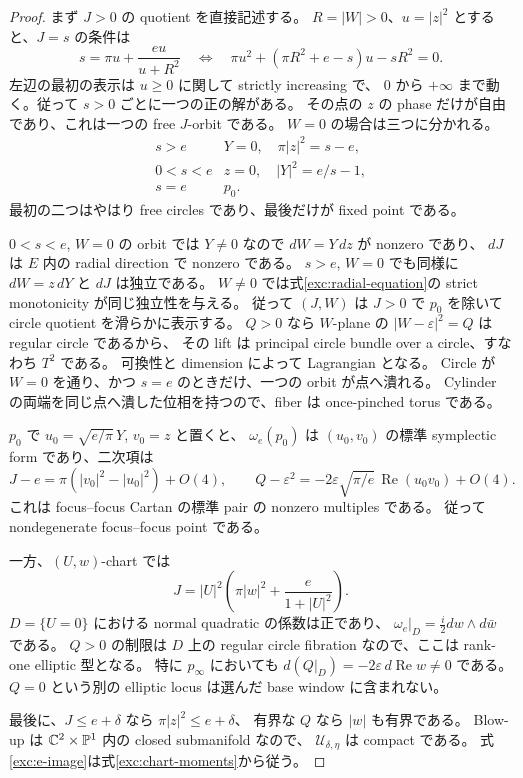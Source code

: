 \begin{proof}
まず $J>0$ の quotient を直接記述する。
$R=|W|>0$、$u=|z|^2$ とすると、$J=s$ の条件は
\begin{equation}\label{exc:radial-equation}
 s=\pi u+\frac{eu}{u+R^2}
 \quad\Longleftrightarrow\quad
 \pi u^2+(\pi R^2+e-s)u-sR^2=0.
\end{equation}
左辺の最初の表示は $u\ge0$ に関して strictly increasing で、
$0$ から $+\infty$ まで動く。従って $s>0$ ごとに一つの正の解がある。
その点の $z$ の phase だけが自由であり、これは一つの free $J$-orbit である。
$W=0$ の場合は三つに分かれる。
\[
\begin{array}{c|c}
 s>e & Y=0,\quad \pi|z|^2=s-e,\\
 0<s<e & z=0,\quad |Y|^2=e/s-1,\\
 s=e & p_0.
\end{array}
\]
最初の二つはやはり free circles であり、最後だけが fixed point である。

$0<s<e$, $W=0$ の orbit では $Y\ne0$ なので $dW=Y\,dz$ が nonzero であり、
$dJ$ は $E$ 内の radial direction で nonzero である。
$s>e$, $W=0$ でも同様に $dW=z\,dY$ と $dJ$ は独立である。
$W\ne0$ では式\eqref{exc:radial-equation}の strict monotonicity が同じ独立性を与える。
従って $(J,W)$ は $J>0$ で $p_0$ を除いて circle quotient を滑らかに表示する。
$Q>0$ なら $W$-plane の $|W-\varepsilon|^2=Q$ は regular circle であるから、
その lift は principal circle bundle over a circle、すなわち $T^2$ である。
可換性と dimension によって Lagrangian となる。
Circle が $W=0$ を通り、かつ $s=e$ のときだけ、一つの orbit が点へ潰れる。
Cylinder の両端を同じ点へ潰した位相を持つので、fiber は once-pinched torus である。

$p_0$ で $u_0=\sqrt{e/\pi}\,Y$, $v_0=z$ と置くと、
$\omega_e(p_0)$ は $(u_0,v_0)$ の標準 symplectic form であり、二次項は
\begin{equation}\label{exc:focus-quadratic}
 J-e=\pi(|v_0|^2-|u_0|^2)+O(4),\qquad
 Q-\varepsilon^2=-2\varepsilon\sqrt{\pi/e}\,
      \operatorname{Re}(u_0v_0)+O(4).
\end{equation}
これは focus--focus Cartan の標準 pair の nonzero multiples である。
従って nondegenerate focus--focus point である。

一方、$(U,w)$-chart では
\begin{equation}\label{exc:boundary-moment}
 J=|U|^2\left(\pi|w|^2+\frac{e}{1+|U|^2}\right).
\end{equation}
$D=\{U=0\}$ における normal quadratic の係数は正であり、
$\omega_e|_D=\frac i2dw\wedge d\bar w$ である。
$Q>0$ の制限は $D$ 上の regular circle fibration なので、ここは rank-one elliptic 型となる。
特に $p_\infty$ においても $d(Q|_D)=-2\varepsilon\,d\operatorname{Re}w\ne0$ である。
$Q=0$ という別の elliptic locus は選んだ base window に含まれない。

最後に、$J\le e+\delta$ なら $\pi|z|^2\le e+\delta$、
有界な $Q$ なら $|w|$ も有界である。
Blow-up は $\mathbb C^2\times\mathbb P^1$ 内の closed submanifold なので、
$\mathcal U_{\delta,\eta}$ は compact である。
式\eqref{exc:e-image}は式\eqref{exc:chart-moments}から従う。
\end{proof}

